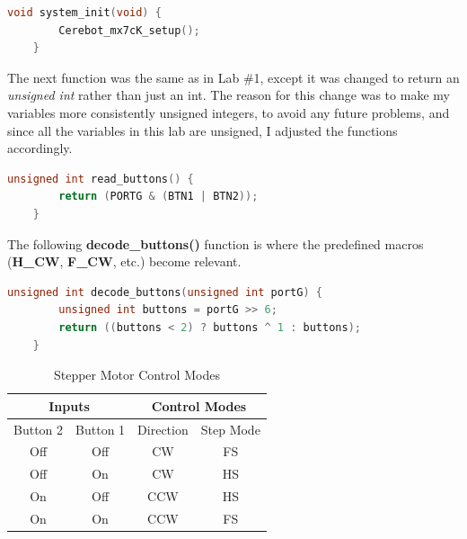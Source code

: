 \documentclass[a4paper, 12pt]{article}
\begin{document}
	\begin{mdframed}[backgroundcolor=code-gray, roundcorner=10pt,
								innerleftmargin=5, innertopmargin=5, innerbottommargin=5]	
	\begin{lstlisting}[language=C, caption=Setup Wrapper Function, tabsize=2]
	void system_init(void) {
		Cerebot_mx7cK_setup();
	}
	\end{lstlisting}
	\end{mdframed}
	
The next function was the same as in Lab \#1, except it was changed to return an \textit{unsigned int} rather than just an int. The reason for this change was to make my variables more consistently unsigned integers, to avoid any future problems, and since all the variables in this lab are unsigned, I adjusted the functions accordingly.

	\begin{mdframed}[backgroundcolor=code-gray, roundcorner=10pt,
								innerleftmargin=5, innertopmargin=5, innerbottommargin=5]	
	\begin{lstlisting}[language=C, caption=BTN1 and BTN2 Reading, tabsize=2]
	unsigned int read_buttons() {
		return (PORTG & (BTN1 | BTN2));
	}
	\end{lstlisting}
	\end{mdframed}
	
The following \textbf{decode\_buttons()} function is where the predefined macros (\textbf{H\_CW}, \textbf{F\_CW}, etc.) become relevant. 

	\begin{mdframed}[backgroundcolor=code-gray, roundcorner=10pt,
								innerleftmargin=5, innertopmargin=5, innerbottommargin=5]	
	\begin{lstlisting}[language=C, caption=Input to Control Mode Mapping, tabsize=2]
	unsigned int decode_buttons(unsigned int portG) {
		unsigned int buttons = portG >> 6;
		return ((buttons < 2) ? buttons ^ 1 : buttons);
	}
	\end{lstlisting}
	\end{mdframed}
	
\begin{table}[h]
\centering
\begin{tabular}{cc|cc}
\multicolumn{2}{c}{\textbf{Inputs}} & \multicolumn{2}{c}{\textbf{Control Modes}} \\
\hline
Button 2 & Button 1 & Direction & Step Mode \\
\hline
Off & Off & CW & FS \\
Off & On & CW & HS \\
On & Off & CCW & HS \\
On & On & CCW & FS \\
\end{tabular}
\caption{Stepper Motor Control Modes}
\end{table}
\end{document}
